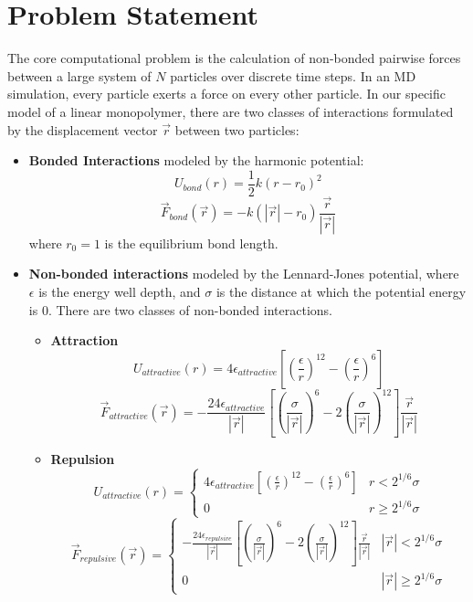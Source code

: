 \documentclass[12pt]{article}
\begin{document}
\section{Problem Statement}
The core computational problem is the calculation of non-bonded pairwise forces between a large system of $N$ particles over discrete time steps. In an MD simulation, every particle exerts a force on every other particle. In our specific model of a linear monopolymer, there are two classes of interactions formulated by the displacement vector $\vec{r}$ between two particles:
\begin{itemize}
    \item \textbf{Bonded Interactions} modeled by the harmonic potential:
    \[U_{bond}(r)=\frac{1}{2}k(r-r_0)^2\]
    \[\vec{F}_{bond}(\vec{r})=-k(|\vec{r}|-r_0)\frac{\vec{r}}{|\vec{r}|}\]
    where $r_0=1$ is the equilibrium bond length.
    \item \textbf{Non-bonded interactions} modeled by the Lennard-Jones potential, where $\epsilon$ is the energy well depth, and $\sigma$ is the distance at which the potential energy is $0$. There are two classes of non-bonded interactions.
    \begin{itemize}
        \item \textbf{Attraction} 
        \[ U_{attractive}(r)=4\epsilon_{attractive}\left[ \left(\frac{\epsilon}{r}\right)^{12} - \left(\frac{\epsilon}{r}\right)^{6} \right] \]
        \begin{equation*}
            \vec{F}_{attractive}(\vec{r})= 
                -\frac{24\epsilon_{attractive}}{|\vec{r}|}\left[\left(\frac{\sigma}{|\vec{r}|}\right)^6-2\left(\frac{\sigma}{|\vec{r}|}\right)^{12}\right]\frac{\vec{r}}{|\vec{r}|}
        \end{equation*}
        \item \textbf{Repulsion}
        \begin{equation*}
            U_{attractive}(r)=\begin{cases}
                4\epsilon_{attractive}\left[ \left(\frac{\epsilon}{r}\right)^{12} - \left(\frac{\epsilon}{r}\right)^{6} \right] & r<2^{1/6}\sigma\\
                0 & r\ge 2^{1/6}\sigma
            \end{cases}
        \end{equation*}
        \begin{equation*}
            \vec{F}_{repulsive}(\vec{r})=\begin{cases}
                 -\frac{24\epsilon_{repulsive}}{|\vec{r}|}\left[\left(\frac{\sigma}{|\vec{r}|}\right)^6-2\left(\frac{\sigma}{|\vec{r}|}\right)^{12}\right]\frac{\vec{r}}{|\vec{r}|} & |\vec{r}|<2^{1/6}\sigma \\
                 0 & |\vec{r}|\ge 2^{1/6}\sigma
            \end{cases}
        \end{equation*}
    \end{itemize}
\end{itemize}
\end{document}
